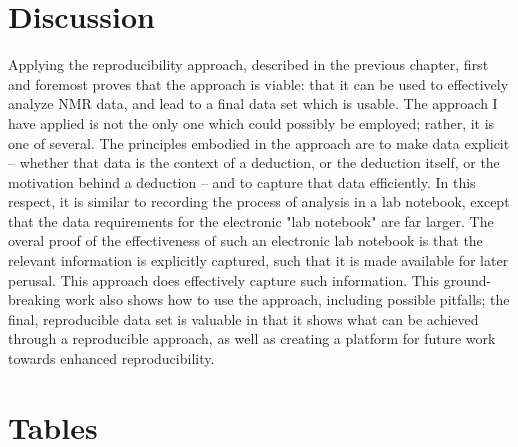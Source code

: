 \section{Discussion}
Applying the reproducibility approach, described in the previous chapter, first
and foremost proves that the approach is viable: that it can be used to 
effectively analyze NMR data, and lead to a final data set which is usable.  
The approach I have applied is not the only one 
which could possibly be employed; rather, it is one of several.  The principles
embodied in the approach are to make data explicit -- whether that data is the
context of a deduction, or the deduction itself, or the motivation behind a
deduction -- and to capture that data efficiently.  In this respect, it is 
similar to recording the process of analysis in a lab notebook, except that 
the data requirements for the electronic "lab notebook" are far larger.
The overal proof of the effectiveness of such an electronic lab notebook is
that the relevant information is explicitly captured, such that it is made
available for later perusal.  This approach does effectively capture such 
information.  This ground-breaking work also shows how to
use the approach, including possible pitfalls;  the final, reproducible data
set is valuable in that it shows what can be achieved through a reproducible
approach, as well as creating a platform for future work towards enhanced
reproducibility.


\clearpage
\section{Tables}

